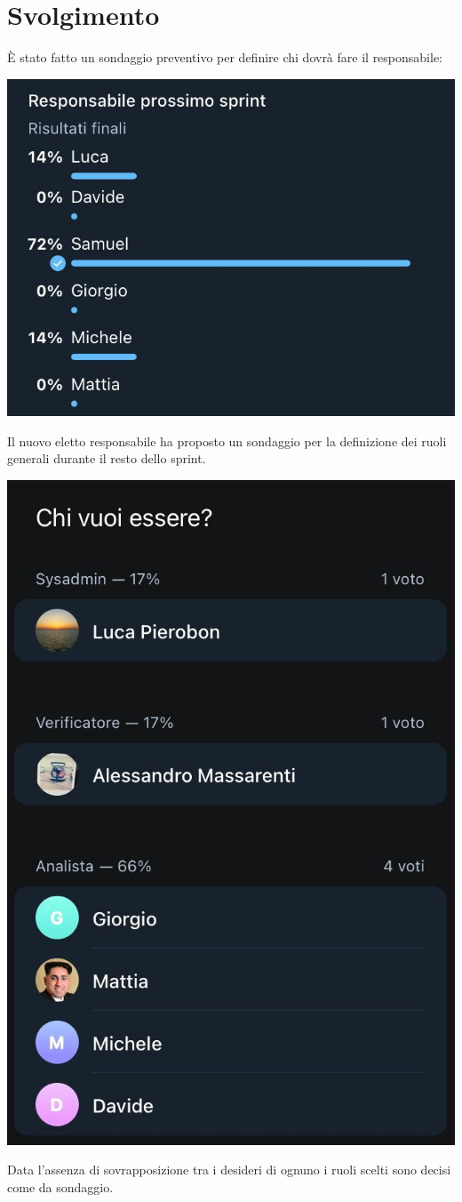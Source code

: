 \section{Svolgimento}

È stato fatto un sondaggio preventivo per definire chi dovrà fare il responsabile:
\begin{center}
\includegraphics[width = 0.5\linewidth]{img/sondaggio_responsabile.png}
\end{center}

Il nuovo eletto responsabile ha proposto un sondaggio per la definizione dei ruoli generali durante il resto dello sprint.

\begin{center}
    \includegraphics[width = 0.4\linewidth]{img/ruoli.png}
\end{center}

Data l'assenza di sovrapposizione tra i desideri di ognuno i ruoli scelti sono decisi come da sondaggio.
